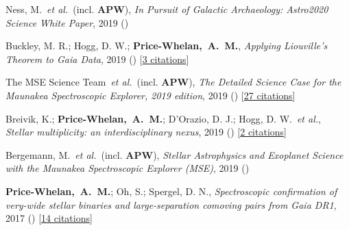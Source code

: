 \item[{\color{deemph}\scriptsize6}]Ness, M.~\textit{et al.}~(incl. \textbf{APW}), \textit{In Pursuit of Galactic Archaeology: Astro2020 Science White Paper}, 2019 ()

\item[{\color{deemph}\scriptsize5}]Buckley, M. R.; Hogg, D. W.; \textbf{Price-Whelan,~A.~M.}, \textit{Applying Liouville's Theorem to Gaia Data}, 2019 () [\href{http://adsabs.harvard.edu/abs/2019arXiv190700987B}{3 citations}]

\item[{\color{deemph}\scriptsize4}]The MSE Science Team~\textit{et al.}~(incl. \textbf{APW}), \textit{The Detailed Science Case for the Maunakea Spectroscopic Explorer, 2019 edition}, 2019 () [\href{http://adsabs.harvard.edu/abs/2019arXiv190404907T}{27 citations}]

\item[{\color{deemph}\scriptsize3}]Breivik, K.; \textbf{Price-Whelan,~A.~M.}; D'Orazio, D. J.; Hogg, D. W.~\textit{et al.}, \textit{Stellar multiplicity: an interdisciplinary nexus}, 2019 () [\href{http://adsabs.harvard.edu/abs/2019arXiv190305094B}{2 citations}]

\item[{\color{deemph}\scriptsize2}]Bergemann, M.~\textit{et al.}~(incl. \textbf{APW}), \textit{Stellar Astrophysics and Exoplanet Science with the Maunakea Spectroscopic Explorer (MSE)}, 2019 ()

\item[{\color{deemph}\scriptsize1}]\textbf{Price-Whelan,~A.~M.}; Oh, S.; Spergel, D. N., \textit{Spectroscopic confirmation of very-wide stellar binaries and large-separation comoving pairs from Gaia DR1}, 2017 () [\href{http://adsabs.harvard.edu/abs/2017arXiv170903532P}{14 citations}]